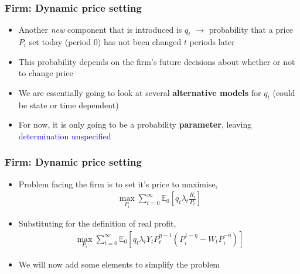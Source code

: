 \documentclass[10pt, xcolor=x11names, table]{beamer}
\begin{document}
\begin{frame}
\frametitle{Firm: Dynamic price setting}
\begin{itemize}
\item Another \emph{new} component that is introduced is $q_{t}$ $\rightarrow$ probability that a price $P_{i}$ set today (period 0) has not been changed $t$ periods later
\item This probability depends on the firm's future decisions about whether or not to change price
\item We are essentially going to look at several \textbf{alternative models} for $q_{t}$ (could be state or time dependent)
\item For now, it is only going to be a probability \textbf{parameter}, leaving \textcolor{blue}{determination unspecified}
\end{itemize}
\end{frame}

\begin{frame}
\frametitle{Firm: Dynamic price setting}
\begin{itemize}
\item Problem facing the firm is to set it's price to maximise,
\begin{align*}
\max_{P_{i}} \sum^{\infty}_{t=0}\mathbb{E}_{0}\left[q_{t}\lambda_{t}\frac{R_{i}}{P_{t}}\right]
\end{align*}
\item Substituting for the definition of real profit,
\begin{align*}
\max_{P_{i}} \sum^{\infty}_{t=0}\mathbb{E}_{0}\left[q_{t}\lambda_{t}Y_{t}P_{t}^{\eta-1}(P_{i}^{1-\eta} - W_{t}P_{i}^{-\eta})\right]
\end{align*}
\item We will now add some elements to simplify the problem
\end{itemize}
\end{frame}
\end{document}
